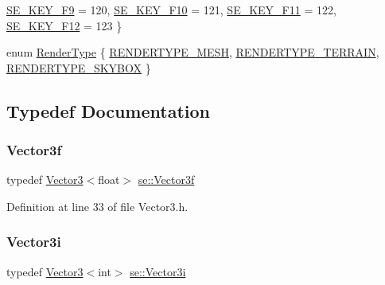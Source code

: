 \begin{DoxyCompactItemize}
\mbox{\hyperlink{namespacese_a94221cf8f238f1eadbe3ac4b8ac7bc71a2abeaabcfa6d9af9e7eed4f7fd3fb05d}{S\+E\+\_\+\+K\+E\+Y\+\_\+\+F9}} = 120, 
\newline
\mbox{\hyperlink{namespacese_a94221cf8f238f1eadbe3ac4b8ac7bc71acadc0c5b59f64dbeb5204bff6a4a4062}{S\+E\+\_\+\+K\+E\+Y\+\_\+\+F10}} = 121, 
\mbox{\hyperlink{namespacese_a94221cf8f238f1eadbe3ac4b8ac7bc71a0a0a516b8f5e6b562557c82e59d9cc79}{S\+E\+\_\+\+K\+E\+Y\+\_\+\+F11}} = 122, 
\mbox{\hyperlink{namespacese_a94221cf8f238f1eadbe3ac4b8ac7bc71a8c62dd59f470fbcba1b48460298e91c5}{S\+E\+\_\+\+K\+E\+Y\+\_\+\+F12}} = 123
 \}
\item 
enum \mbox{\hyperlink{namespacese_a9ed62241331cac830c5c1ba8450afc2b}{Render\+Type}} \{ \mbox{\hyperlink{namespacese_a9ed62241331cac830c5c1ba8450afc2ba3ce5a8f382bf5941b884aa6b16b70270}{R\+E\+N\+D\+E\+R\+T\+Y\+P\+E\+\_\+\+M\+E\+SH}}, 
\mbox{\hyperlink{namespacese_a9ed62241331cac830c5c1ba8450afc2ba7a3d35d82775bdb0c6d675a819de6f5d}{R\+E\+N\+D\+E\+R\+T\+Y\+P\+E\+\_\+\+T\+E\+R\+R\+A\+IN}}, 
\mbox{\hyperlink{namespacese_a9ed62241331cac830c5c1ba8450afc2ba21f47be8136fdc0a49d2ad1c8912841a}{R\+E\+N\+D\+E\+R\+T\+Y\+P\+E\+\_\+\+S\+K\+Y\+B\+OX}}
 \}
\end{DoxyCompactItemize}


\subsection{Typedef Documentation}
\mbox{\label{namespacese_a12e07512d95e2fdebdaf74a5ea2cf5f6}} 
\subsubsection{\texorpdfstring{Vector3f}{Vector3f}}
{\footnotesize\ttfamily typedef \mbox{\hyperlink{classse_1_1_vector3}{Vector3}}$<$float$>$ \mbox{\hyperlink{namespacese_a12e07512d95e2fdebdaf74a5ea2cf5f6}{se\+::\+Vector3f}}}



Definition at line 33 of file Vector3.\+h.

\mbox{\label{namespacese_ada11715de7cf6e87b5dfb4611fe68d29}} 
\subsubsection{\texorpdfstring{Vector3i}{Vector3i}}
{\footnotesize\ttfamily typedef \mbox{\hyperlink{classse_1_1_vector3}{Vector3}}$<$int$>$ \mbox{\hyperlink{namespacese_ada11715de7cf6e87b5dfb4611fe68d29}{se\+::\+Vector3i}}}



